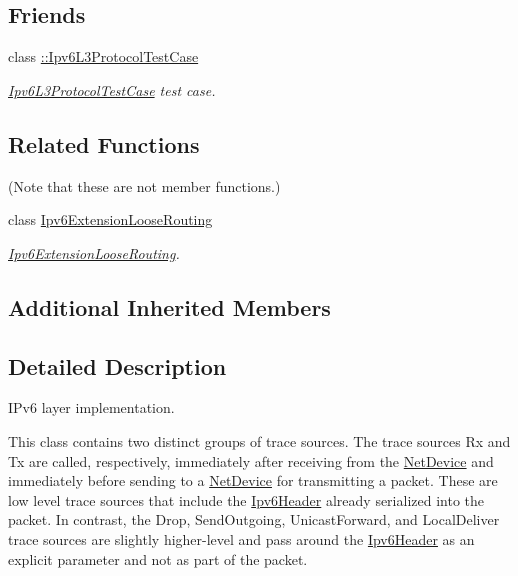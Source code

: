 \subsection*{Friends}
\begin{DoxyCompactItemize}
\item 
class \hyperlink{classns3_1_1Ipv6L3Protocol_a09b6212a5017142b4f4244e3809708b9}{\+::\+Ipv6\+L3\+Protocol\+Test\+Case}
\begin{DoxyCompactList}\small\item\em \hyperlink{classIpv6L3ProtocolTestCase}{Ipv6\+L3\+Protocol\+Test\+Case} test case. \end{DoxyCompactList}\end{DoxyCompactItemize}
\subsection*{Related Functions}
(Note that these are not member functions.) \begin{DoxyCompactItemize}
\item 
class \hyperlink{classns3_1_1Ipv6L3Protocol_aa3cefd4bf01ad6e80cfae2da346cccc2}{Ipv6\+Extension\+Loose\+Routing}
\begin{DoxyCompactList}\small\item\em \hyperlink{classns3_1_1Ipv6ExtensionLooseRouting}{Ipv6\+Extension\+Loose\+Routing}. \end{DoxyCompactList}\end{DoxyCompactItemize}
\subsection*{Additional Inherited Members}


\subsection{Detailed Description}
I\+Pv6 layer implementation. 

This class contains two distinct groups of trace sources. The trace sources \textquotesingle{}Rx\textquotesingle{} and \textquotesingle{}Tx\textquotesingle{} are called, respectively, immediately after receiving from the \hyperlink{classns3_1_1NetDevice}{Net\+Device} and immediately before sending to a \hyperlink{classns3_1_1NetDevice}{Net\+Device} for transmitting a packet. These are low level trace sources that include the \hyperlink{classns3_1_1Ipv6Header}{Ipv6\+Header} already serialized into the packet. In contrast, the Drop, Send\+Outgoing, Unicast\+Forward, and Local\+Deliver trace sources are slightly higher-\/level and pass around the \hyperlink{classns3_1_1Ipv6Header}{Ipv6\+Header} as an explicit parameter and not as part of the packet. 

